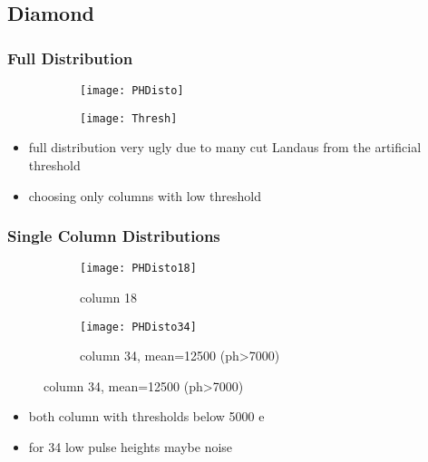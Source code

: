 \subsection{Diamond}
\begin{frame}
	\frametitle{Full Distribution}
	\begin{figure} 
		\begin{center}
			\begin{subfigure}{0.45\textwidth}  
				\centering 
				\texttt{[image: PHDisto]}
			\end{subfigure}
			\begin{subfigure}{0.45\textwidth} 
				\centering 
				\texttt{[image: Thresh]}
			\end{subfigure} 
		\end{center}
	\end{figure}
	\begin{itemize}
		\item full distribution very ugly due to many cut Landaus from the artificial threshold
		\item \ra choosing only columns with low threshold
	\end{itemize}
\end{frame}
\begin{frame}
	\frametitle{Single Column Distributions}
	\begin{figure} 
		\begin{center}
			\begin{subfigure}{0.45\textwidth}  
				\centering 
				\texttt{[image: PHDisto18]}
				\caption{column 18}
			\end{subfigure}
			\begin{subfigure}{0.45\textwidth} 
				\centering 
				\texttt{[image: PHDisto34]}
				\caption{column 34, mean=12500 (ph>7000)}
			\end{subfigure} 
		\end{center}
	\end{figure}
	\begin{itemize}
		\item both column with thresholds below 5000 e
		\item for 34 low pulse heights maybe noise
	\end{itemize}
\end{frame}
